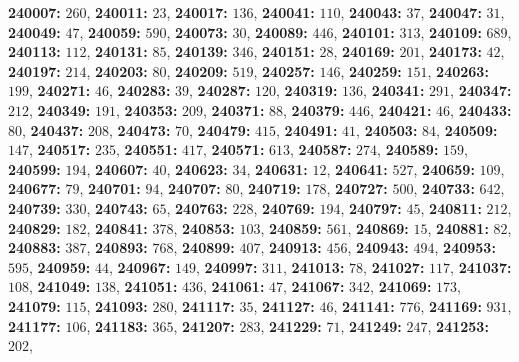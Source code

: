 \textsf{\bfseries 240007:} $260$, \textsf{\bfseries 240011:} $23$, \textsf{\bfseries 240017:} $136$, \textsf{\bfseries 240041:} $110$, \textsf{\bfseries 240043:} $37$, \textsf{\bfseries 240047:} $31$, \textsf{\bfseries 240049:} $47$, \textsf{\bfseries 240059:} $590$, \textsf{\bfseries 240073:} $30$, \textsf{\bfseries 240089:} $446$, \textsf{\bfseries 240101:} $313$, \textsf{\bfseries 240109:} $689$, \textsf{\bfseries 240113:} $112$, \textsf{\bfseries 240131:} $85$, \textsf{\bfseries 240139:} $346$, \textsf{\bfseries 240151:} $28$, \textsf{\bfseries 240169:} $201$, \textsf{\bfseries 240173:} $42$, \textsf{\bfseries 240197:} $214$, \textsf{\bfseries 240203:} $80$, \textsf{\bfseries 240209:} $519$, \textsf{\bfseries 240257:} $146$, \textsf{\bfseries 240259:} $151$, \textsf{\bfseries 240263:} $199$, \textsf{\bfseries 240271:} $46$, \textsf{\bfseries 240283:} $39$, \textsf{\bfseries 240287:} $120$, \textsf{\bfseries 240319:} $136$, \textsf{\bfseries 240341:} $291$, \textsf{\bfseries 240347:} $212$, \textsf{\bfseries 240349:} $191$, \textsf{\bfseries 240353:} $209$, \textsf{\bfseries 240371:} $88$, \textsf{\bfseries 240379:} $446$, \textsf{\bfseries 240421:} $46$, \textsf{\bfseries 240433:} $80$, \textsf{\bfseries 240437:} $208$, \textsf{\bfseries 240473:} $70$, \textsf{\bfseries 240479:} $415$, \textsf{\bfseries 240491:} $41$, \textsf{\bfseries 240503:} $84$, \textsf{\bfseries 240509:} $147$, \textsf{\bfseries 240517:} $235$, \textsf{\bfseries 240551:} $417$, \textsf{\bfseries 240571:} $613$, \textsf{\bfseries 240587:} $274$, \textsf{\bfseries 240589:} $159$, \textsf{\bfseries 240599:} $194$, \textsf{\bfseries 240607:} $40$, \textsf{\bfseries 240623:} $34$, \textsf{\bfseries 240631:} $12$, \textsf{\bfseries 240641:} $527$, \textsf{\bfseries 240659:} $109$, \textsf{\bfseries 240677:} $79$, \textsf{\bfseries 240701:} $94$, \textsf{\bfseries 240707:} $80$, \textsf{\bfseries 240719:} $178$, \textsf{\bfseries 240727:} $500$, \textsf{\bfseries 240733:} $642$, \textsf{\bfseries 240739:} $330$, \textsf{\bfseries 240743:} $65$, \textsf{\bfseries 240763:} $228$, \textsf{\bfseries 240769:} $194$, \textsf{\bfseries 240797:} $45$, \textsf{\bfseries 240811:} $212$, \textsf{\bfseries 240829:} $182$, \textsf{\bfseries 240841:} $378$, \textsf{\bfseries 240853:} $103$, \textsf{\bfseries 240859:} $561$, \textsf{\bfseries 240869:} $15$, \textsf{\bfseries 240881:} $82$, \textsf{\bfseries 240883:} $387$, \textsf{\bfseries 240893:} $768$, \textsf{\bfseries 240899:} $407$, \textsf{\bfseries 240913:} $456$, \textsf{\bfseries 240943:} $494$, \textsf{\bfseries 240953:} $595$, \textsf{\bfseries 240959:} $44$, \textsf{\bfseries 240967:} $149$, \textsf{\bfseries 240997:} $311$, \textsf{\bfseries 241013:} $78$, \textsf{\bfseries 241027:} $117$, \textsf{\bfseries 241037:} $108$, \textsf{\bfseries 241049:} $138$, \textsf{\bfseries 241051:} $436$, \textsf{\bfseries 241061:} $47$, \textsf{\bfseries 241067:} $342$, \textsf{\bfseries 241069:} $173$, \textsf{\bfseries 241079:} $115$, \textsf{\bfseries 241093:} $280$, \textsf{\bfseries 241117:} $35$, \textsf{\bfseries 241127:} $46$, \textsf{\bfseries 241141:} $776$, \textsf{\bfseries 241169:} $931$, \textsf{\bfseries 241177:} $106$, \textsf{\bfseries 241183:} $365$, \textsf{\bfseries 241207:} $283$, \textsf{\bfseries 241229:} $71$, \textsf{\bfseries 241249:} $247$, \textsf{\bfseries 241253:} $202$, 
